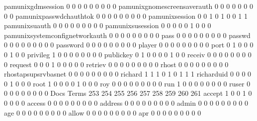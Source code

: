 \documentclass[compress,8pt]{beamer}
\begin{document}
\begin{frame}
\begin{Schunk}
  pamunixgdmsession                          0   0   0   0   0   0   0   0   0
  pamunixgnomescreensaverauth                0   0   0   0   0   0   0   0   0
  pamunixpasswdchauthtok                     0   0   0   0   0   0   0   0   0
  pamunixsession                             0   0   1   0   1   0   0   1   1
  pamunixsuauth                              0   0   0   0   0   0   0   0   0
  pamunixsusession                           0   0   0   0   0   1   0   0   0
  pamunixsystemconfignetworkauth             0   0   0   0   0   0   0   0   0
  pass                                       0   0   0   0   0   0   0   0   0
  passwd                                     0   0   0   0   0   0   0   0   0
  password                                   0   0   0   0   0   0   0   0   0
  player                                     0   0   0   0   0   0   0   0   0
  port                                       0   1   0   0   0   0   1   0   0
  privileg                                   1   0   0   0   0   0   0   0   0
  publickey                                  0   1   0   0   0   0   1   0   0
  receiv                                     0   0   0   0   0   0   0   0   0
  request                                    0   0   0   1   0   0   0   0   0
  retriev                                    0   0   0   0   0   0   0   0   0
  rhost                                      0   0   0   0   0   0   0   0   0
  rhostapsupsrvbasnet                        0   0   0   0   0   0   0   0   0
  richard                                    1   1   1   0   1   0   1   1   1
  richarduid                                 0   0   0   0   0   1   0   0   0
  root                                       1   0   0   0   0   1   0   0   0
  roy                                        0   0   0   0   0   0   0   0   0
  run                                        1   0   0   0   0   0   0   0   0
  ruser                                      0   0   0   0   0   0   0   0   0
                                          Docs
Terms                                      253 254 255 256 257 258 259 260 261
  accept                                     1   0   0   1   0   0   0   0   0
  access                                     0   0   0   0   0   0   0   0   0
  address                                    0   0   0   0   0   0   0   0   0
  admin                                      0   0   0   0   0   0   0   0   0
  age                                        0   0   0   0   0   0   0   0   0
  allow                                      0   0   0   0   0   0   0   0   0
  apr                                        0   0   0   0   0   0   0   0   0

\end{Schunk}
\end{frame}
\end{document}
